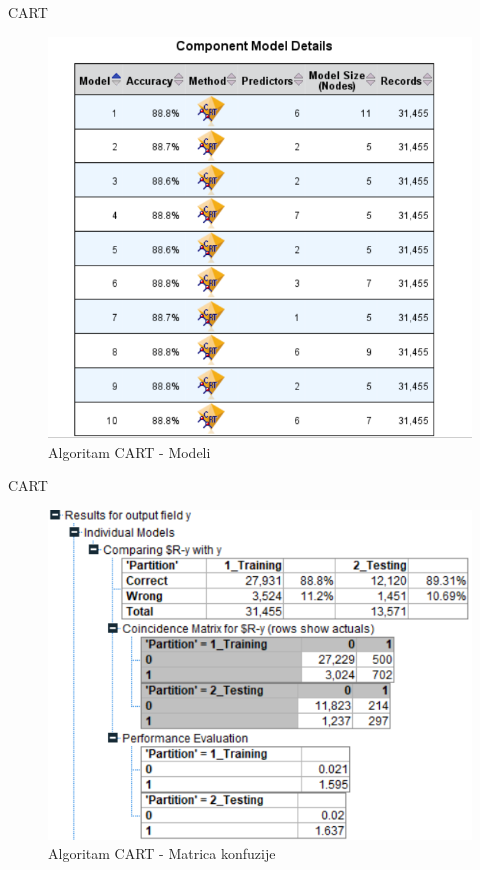 \documentclass{beamer}
\begin{document}
\begin{frame}{CART}
    \begin{figure}[h!]
                \begin{center}
                \includegraphics[scale=0.40]{cart_component_model.png}
                \end{center}
                \caption{Algoritam CART - Modeli}
             \end{figure}
\end{frame}

\begin{frame}{CART}
    \begin{figure}[h!]
                \begin{center}
                \includegraphics[scale=0.60]{cart_matrix.png}
                \end{center}
                \caption{Algoritam CART - Matrica konfuzije}
             \end{figure}
\end{frame}
\end{document}
